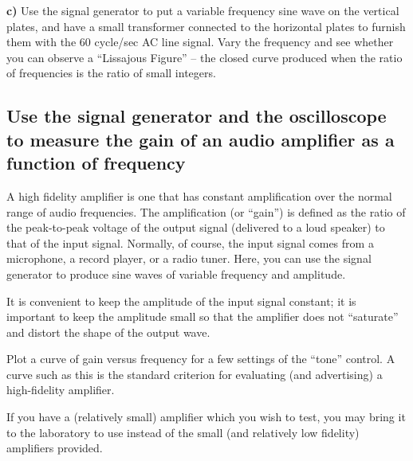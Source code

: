 \noindent \textbf{c)} Use the signal generator to put a variable frequency sine wave on the vertical plates, and have a small transformer connected to the horizontal plates to furnish them with the 60 cycle/sec AC line signal. Vary the frequency and see whether you can observe a ``Lissajous Figure'' -- the closed curve produced when the ratio of frequencies is the ratio of small integers. 

\subsection{Use the signal generator and the oscilloscope to measure the gain of an audio amplifier as a function of frequency}

A high fidelity amplifier is one that has constant amplification over the normal range of audio frequencies. The amplification (or ``gain'') is defined as the ratio of the peak-to-peak voltage of the output signal (delivered to a loud speaker) to that of the input signal. Normally, of course, the input signal comes from a microphone, a record player, or a radio tuner. Here, you can use the signal generator to produce sine waves of variable frequency and amplitude.\myskip

It is convenient to keep the amplitude of the input signal constant; it is important to keep the amplitude small so that the amplifier does not ``saturate'' and distort the shape of the output wave.\myskip

Plot a curve of gain versus frequency for a few settings of the ``tone'' control. A curve such as this is the standard criterion for evaluating (and advertising) a high-fidelity amplifier. \myskip

If you have a (relatively small) amplifier which you wish to test, you may bring it to the laboratory to use instead of the small (and relatively low fidelity) amplifiers provided.

